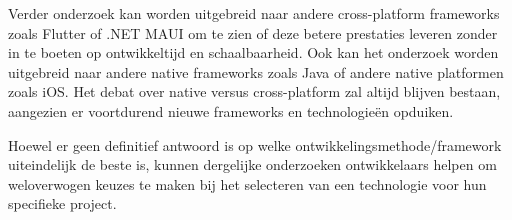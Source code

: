 \documentclass[a0,portrait]{hogent-poster}
\begin{document}
\begin{multicols}{2}
Verder onderzoek kan worden uitgebreid naar andere cross-platform frameworks zoals Flutter of 
.NET MAUI om te zien of deze betere prestaties leveren zonder in te boeten op ontwikkeltijd en 
schaalbaarheid. Ook kan het onderzoek worden uitgebreid naar andere native frameworks zoals 
Java of andere native platformen zoals iOS. Het debat over native versus cross-platform zal 
altijd blijven bestaan, aangezien er voortdurend nieuwe frameworks en technologieën opduiken. 

Hoewel er geen definitief antwoord is op welke ontwikkelingsmethode/framework uiteindelijk 
de beste is, kunnen dergelijke onderzoeken ontwikkelaars helpen om weloverwogen keuzes te 
maken bij het selecteren van een technologie voor hun specifieke project.

\end{multicols}
\end{document}
